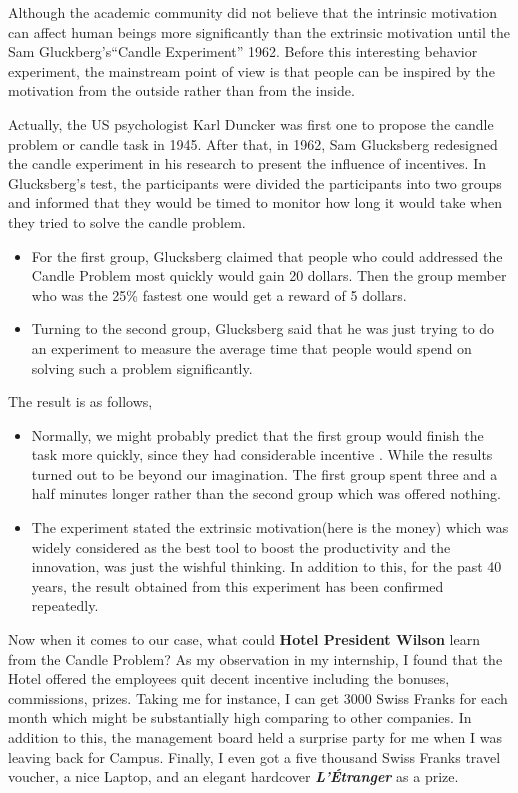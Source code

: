 \documentclass[12pt,onecolumn,a4paper]{IEEEtran}
\begin{document}
Although the academic community did not believe that the intrinsic motivation can affect human beings more significantly than the extrinsic motivation until the Sam Gluckberg's``Candle Experiment'' 1962\cite{glucksberg}. Before this interesting behavior experiment, the mainstream point of view is that people can be inspired by the motivation from the outside rather than from the inside. 

Actually, the US psychologist Karl Duncker was first one to propose the candle problem or candle task in 1945. After that, in 1962, Sam Glucksberg\cite{glucksberg} redesigned the candle experiment in his research to present the influence of incentives. In Glucksberg's test, the participants were divided the participants into two groups and informed that they would be timed to monitor how long it would take when they tried to solve the candle problem.

\begin{itemize}
  \item For the first group, Glucksberg claimed that people who could addressed the Candle Problem most quickly would gain 20 dollars. Then the group member who was the 25\% fastest one would get a reward of 5 dollars.
  \item Turning to the second group, Glucksberg said that he was just trying to do an experiment to measure the average time that people would spend on solving such a problem significantly.
\end{itemize}

The result is as follows,
\begin{itemize}
  \item Normally, we might probably predict that the first group would finish the task more quickly, since they had considerable incentive . While the results turned out to be beyond our imagination. The first group spent three and a half minutes longer rather than the second group which was offered nothing. 
  
  \item The experiment stated the extrinsic motivation(here is the money) which was widely considered as the best tool to boost the productivity and the innovation, was just the wishful thinking. In addition to this, for the past 40 years, the result obtained from this experiment has been confirmed repeatedly.
\end{itemize}

\newpage
Now when it comes to our case, what could \textbf{Hotel President Wilson} learn from the Candle Problem? As my observation in my internship, I found that the Hotel offered the employees quit decent incentive including the bonuses, commissions, prizes. Taking me for instance, I can get 3000 Swiss Franks for each month which might be substantially high comparing to other companies. In addition to this, the management board held a surprise party for me when I was leaving back for Campus. Finally, I even got a five thousand Swiss Franks travel voucher, a nice Laptop, and an elegant hardcover \textit{\textbf{L'Étranger}} as a prize. 
\end{document}
